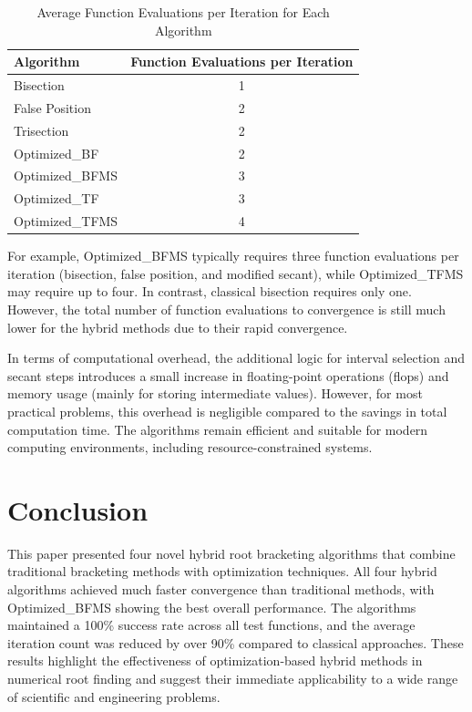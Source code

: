 \documentclass[amsmath, amssymb, aps]{revtex4-2}
\begin{document}
\begin{table}[H]
\centering
\caption{Average Function Evaluations per Iteration for Each Algorithm}
\label{tab:func_evals}
\begin{tabular}{lc}
\toprule
Algorithm & Function Evaluations per Iteration \\
\midrule
Bisection & 1 \\
False Position & 2 \\
Trisection & 2 \\
Optimized\_BF & 2 \\
Optimized\_BFMS & 3 \\
Optimized\_TF & 3 \\
Optimized\_TFMS & 4 \\
\bottomrule
\end{tabular}
\end{table}

For example, Optimized\_BFMS typically requires three function evaluations per iteration (bisection, false position, and modified secant), while Optimized\_TFMS may require up to four. In contrast, classical bisection requires only one. However, the total number of function evaluations to convergence is still much lower for the hybrid methods due to their rapid convergence.

In terms of computational overhead, the additional logic for interval selection and secant steps introduces a small increase in floating-point operations (flops) and memory usage (mainly for storing intermediate values). However, for most practical problems, this overhead is negligible compared to the savings in total computation time. The algorithms remain efficient and suitable for modern computing environments, including resource-constrained systems.

\section{Conclusion}\label{sec:conclusion}

This paper presented four novel hybrid root bracketing algorithms that combine traditional bracketing methods with optimization techniques. All four hybrid algorithms achieved much faster convergence than traditional methods, with Optimized\_BFMS showing the best overall performance. The algorithms maintained a 100\% success rate across all test functions, and the average iteration count was reduced by over 90\% compared to classical approaches. These results highlight the effectiveness of optimization-based hybrid methods in numerical root finding and suggest their immediate applicability to a wide range of scientific and engineering problems.
\end{document}
